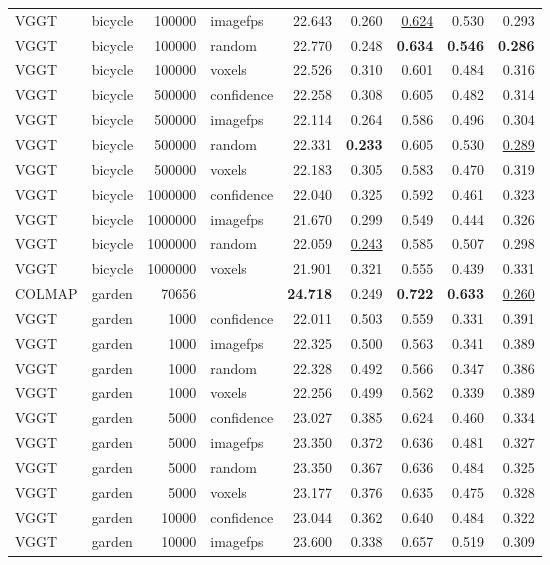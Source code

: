 \begin{table}[H]
\begin{tabular}{llrlrrrrr}
VGGT & bicycle & 100000 & imagefps & 22.643 & 0.260 & \underline{0.624} & 0.530 & 0.293 \\
VGGT & bicycle & 100000 & random & 22.770 & 0.248 & \textbf{0.634} & \textbf{0.546} & \textbf{0.286} \\
VGGT & bicycle & 100000 & voxels & 22.526 & 0.310 & 0.601 & 0.484 & 0.316 \\
VGGT & bicycle & 500000 & confidence & 22.258 & 0.308 & 0.605 & 0.482 & 0.314 \\
VGGT & bicycle & 500000 & imagefps & 22.114 & 0.264 & 0.586 & 0.496 & 0.304 \\
VGGT & bicycle & 500000 & random & 22.331 & \textbf{0.233} & 0.605 & 0.530 & \underline{0.289} \\
VGGT & bicycle & 500000 & voxels & 22.183 & 0.305 & 0.583 & 0.470 & 0.319 \\
VGGT & bicycle & 1000000 & confidence & 22.040 & 0.325 & 0.592 & 0.461 & 0.323 \\
VGGT & bicycle & 1000000 & imagefps & 21.670 & 0.299 & 0.549 & 0.444 & 0.326 \\
VGGT & bicycle & 1000000 & random & 22.059 & \underline{0.243} & 0.585 & 0.507 & 0.298 \\
VGGT & bicycle & 1000000 & voxels & 21.901 & 0.321 & 0.555 & 0.439 & 0.331 \\
\midrule
COLMAP & garden & 70656 &  & \textbf{24.718} & 0.249 & \textbf{0.722} & \textbf{0.633} & \underline{0.260} \\
VGGT & garden & 1000 & confidence & 22.011 & 0.503 & 0.559 & 0.331 & 0.391 \\
VGGT & garden & 1000 & imagefps & 22.325 & 0.500 & 0.563 & 0.341 & 0.389 \\
VGGT & garden & 1000 & random & 22.328 & 0.492 & 0.566 & 0.347 & 0.386 \\
VGGT & garden & 1000 & voxels & 22.256 & 0.499 & 0.562 & 0.339 & 0.389 \\
VGGT & garden & 5000 & confidence & 23.027 & 0.385 & 0.624 & 0.460 & 0.334 \\
VGGT & garden & 5000 & imagefps & 23.350 & 0.372 & 0.636 & 0.481 & 0.327 \\
VGGT & garden & 5000 & random & 23.350 & 0.367 & 0.636 & 0.484 & 0.325 \\
VGGT & garden & 5000 & voxels & 23.177 & 0.376 & 0.635 & 0.475 & 0.328 \\
VGGT & garden & 10000 & confidence & 23.044 & 0.362 & 0.640 & 0.484 & 0.322 \\
VGGT & garden & 10000 & imagefps & 23.600 & 0.338 & 0.657 & 0.519 & 0.309 \\

\end{tabular}
\end{table}
